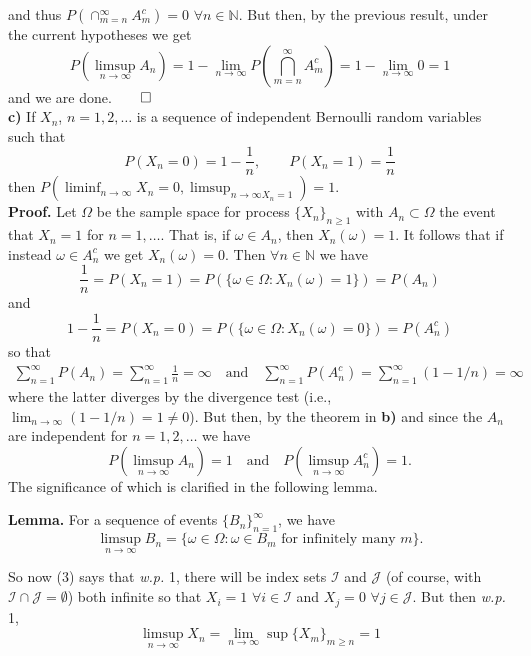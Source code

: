 \documentclass[11pt, letterpaper]{article}
\newcommand{\mbb}[1]{\mathbb{#1}}
\newcommand{\mc}[1]{\mathcal{#1}}
\begin{document}
    and thus $P(\cap_{m=n}^\infty A_m^c)=0$ $\forall n\in\mbb{N}$. But then, by the previous result, under the current hypotheses we get
    \[P\left(\limsup_{n\rightarrow\infty}A_n\right)=1-\lim_{n\rightarrow\infty}P\left(\bigcap_{m=n}^\infty A_m^c\right)=1-\lim_{n\rightarrow\infty}0=1\]
    and we are done.\hfill{$\qed$}\\[10pt]
    {\bf c)} If $X_n$, $n=1,2,\dots$ is a sequence of independent Bernoulli random variables such that
    \[P(X_n=0)=1-\frac{1}{n},\qquad P(X_n=1)=\frac{1}{n}\]
    then $P(\liminf_{n\rightarrow\infty}X_n=0,\limsup_{n\rightarrow\infty X_n=1})=1$.\\[10pt]
    {\bf Proof.} Let $\Omega$ be the sample space for process $\{X_n\}_{n\geq 1}$ with $A_n\subset\Omega$ the event that $X_n=1$ for $n=1,\dots$. That is,
    if $\omega\in A_n$, then $X_n(\omega)=1$. It follows that if instead $\omega\in A_n^c$ we get $X_n(\omega)=0$. Then $\forall n\in\mbb{N}$ we have
    \[\frac{1}{n}=P(X_n=1)=P(\{\omega\in\Omega:X_n(\omega)=1\})=P(A_n)\]
    and
    \[1-\frac{1}{n}=P(X_n=0)=P(\{\omega\in\Omega: X_n(\omega)=0\})=P(A_n^c)\]
    so that
    \begin{align*}
        \sum_{n=1}^\infty P(A_n)=\sum_{n=1}^\infty\frac{1}{n}=\infty\quad\text{and}\quad\sum_{n=1}^\infty P(A_n^c)=\sum_{n=1}^\infty(1-1/n)=\infty
    \end{align*}
    where the latter diverges by the divergence test (i.e., $\lim_{n\rightarrow\infty}(1-1/n)=1\neq0$). But then, by the theorem in {\bf b)} and since the $A_n$ are independent for $n=1,2,\dots$ we have
    \[P(\limsup_{n\rightarrow\infty}A_n)=1\quad\text{and}\quad P(\limsup_{n\rightarrow\infty}A_n^c)=1.\tag{3}\]
    The significance of which is clarified in the following lemma.\\[3pt]
    \begin{center}
        \begin{minipage}[c]{0.85\linewidth}
            {\bf Lemma.} For a sequence of events $\{B_n\}_{n=1}^\infty$, we have
            \[\limsup_{n\rightarrow\infty}B_n=\{\omega\in\Omega:\omega\in B_m\text{ for infinitely many $m$}\}.\]
        \end{minipage}
    \end{center}\vspace{10pt}
    So now (3) says that {{\it w.p.}} 1, there will be index sets $\mc{I}$ and $\mc{J}$ (of course, with $\mc{I}\cap\mc{J}=\emptyset$) both infinite so that
    $X_i=1$ $\forall i\in\mc{I}$ and $X_j=0$ $\forall j\in\mc{J}$. But then {\it w.p.} 1,
    \[\limsup_{n\rightarrow\infty}X_n=\lim_{n\rightarrow\infty}\sup\{X_m\}_{m\geq n}=1\]
\end{document}
